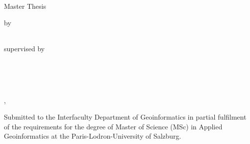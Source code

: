 %
\begin{titlepage}
    \begin{addmargin}[0cm]{-3cm} %
    \begin{center}
        \large

        \hfill

        \vfill

        \begingroup
            \color{Maroon}\spacedallcaps{\myTitle} \\ \bigskip
        \endgroup

        \spacedlowsmallcaps{\mySubtitle} \\ \medskip

        \vfill

        Master Thesis

        \vfill


        by \\
        \myName \\

        \vfill

        supervised by \\
        \mySupervisor \\
        \myOtherSupervisor \\

        \vfill

        \myDepartment \\

        \vfill

        \myLocation, \myTime\

        \vfill

    \end{center}

    \vfill

    \begin{footnotesize}
    \raggedright
    Submitted to the Interfaculty Department of Geoinformatics in partial
    fulfilment of the requirements for the degree of Master of Science (MSc)
    in Applied Geoinformatics at the Paris-Lodron-University of Salzburg.
    \end{footnotesize}

    \vfil


  \end{addmargin}
\end{titlepage}

